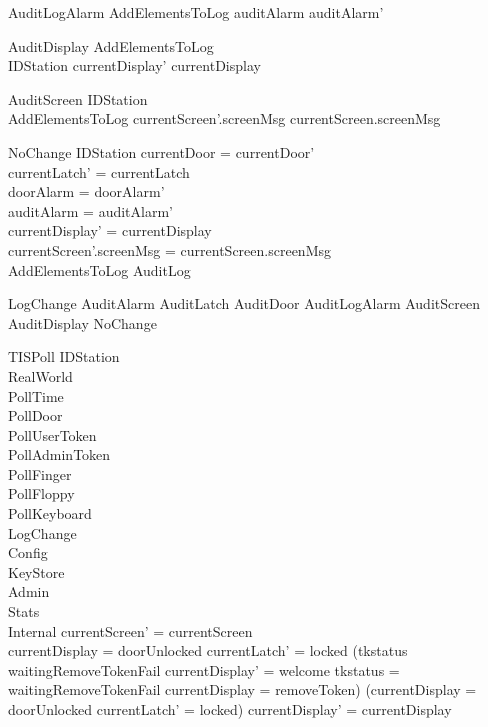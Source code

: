 \begin{schema}{AuditLogAlarm}
  AddElementsToLog
\where
  auditAlarm \neq  auditAlarm'
\end{schema}

\begin{schema}{AuditDisplay}
  AddElementsToLog\\
  \Delta IDStation
\where
  currentDisplay' \neq  currentDisplay
\end{schema}

\begin{schema}{AuditScreen}
  \Delta IDStation\\
  AddElementsToLog
\where
  currentScreen'.screenMsg \neq  currentScreen.screenMsg
\end{schema}

\begin{schema}{NoChange}
  \Delta IDStation
\where
  currentDoor = currentDoor'\\
  currentLatch' = currentLatch\\
  doorAlarm = doorAlarm'\\
  auditAlarm = auditAlarm'\\
  currentDisplay' = currentDisplay\\
  currentScreen'.screenMsg = currentScreen.screenMsg\\
  AddElementsToLog \lor  \Xi AuditLog
\end{schema}

\begin{zed}
LogChange  AuditAlarm \lor  AuditLatch \lor  AuditDoor \lor  AuditLogAlarm \lor  AuditScreen \lor  AuditDisplay \lor  NoChange
\end{zed}

\begin{schema}{TISPoll}
  \Delta IDStation\\
  \Xi RealWorld\\
  PollTime\\
  PollDoor\\
  PollUserToken\\
  PollAdminToken\\
  PollFinger\\
  PollFloppy\\
  PollKeyboard\\
  LogChange\\
  \Xi Config\\
  \Xi KeyStore\\
  \Xi Admin\\
  \Xi Stats\\
  \Xi Internal
\where
  currentScreen' = currentScreen\\
  currentDisplay = doorUnlocked \land  currentLatch' = locked \land  (tkstatus \neq  waitingRemoveTokenFail \land  currentDisplay' = welcome \lor  tkstatus = waitingRemoveTokenFail \land  currentDisplay = removeToken) \lor  \lnot  (currentDisplay = doorUnlocked \land  currentLatch' = locked) \land  currentDisplay' = currentDisplay
\end{schema}

